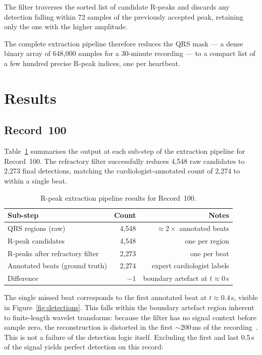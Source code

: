 \documentclass[11pt]{article}
\begin{document}
The filter traverses the sorted list of candidate R-peaks and discards any detection falling within 72 samples of the previously accepted peak, retaining only the one with the higher amplitude.

The complete extraction pipeline therefore reduces the QRS mask — a dense binary array of 648,000 samples for a 30-minute recording — to a compact list of a few hundred precise R-peak indices, one per heartbeat.


\section{Results}\label{sec:results}

\subsection{Record~100}\label{subsec:results-100}

Table~\ref{tab:extraction_results} summarises the output at each sub-step of the extraction pipeline for Record~100. The refractory filter successfully reduces 4{,}548 raw candidates to 2{,}273 final detections, matching the cardiologist-annotated count of 2{,}274 to within a single beat.

\begin{table}[htbp]
\centering
\caption{R-peak extraction pipeline results for Record~100.}
\label{tab:extraction_results}
\begin{tabular}{lrr}
\toprule
\textbf{Sub-step} & \textbf{Count} & \textbf{Notes} \\
\midrule
QRS regions (raw)               & 4{,}548 & $\approx 2\times$ annotated beats \\
R-peak candidates               & 4{,}548 & one per region \\
R-peaks after refractory filter & 2{,}273 & one per beat \\
Annotated beats (ground truth)  & 2{,}274 & expert cardiologist labels \\
\midrule
Difference                      & $-1$    & boundary artefact at $t \approx 0$\,s \\
\bottomrule
\end{tabular}
\end{table}

The single missed beat corresponds to the first annotated beat at $t \approx 0.4$\,s, visible in Figure~\ref{fig:detections}. This falls within the boundary artefact region inherent to finite-length wavelet transforms: because the filter has no signal context before sample zero, the reconstruction is distorted in the first $\sim$200\,ms of the recording~\cite{lin_discrete-wavelet-transform-based_2014}. This is not a failure of the detection logic itself. Excluding the first and last 0.5\,s of the signal yields perfect detection on this record:
\end{document}
